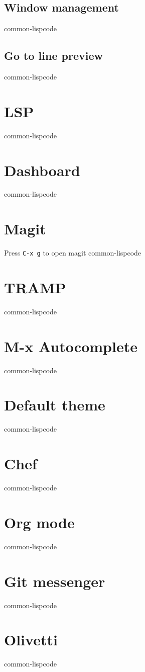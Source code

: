 \documentclass[11pt]{article}
\begin{document}
\subsection{Window management}
\label{sec:org668d97d}
common-lispcode
\subsection{Go to line preview}
\label{sec:org1b7ffdf}
common-lispcode
\section{LSP}
\label{sec:org6a0715c}
common-lispcode
\section{Dashboard}
\label{sec:orgf586485}
common-lispcode
\section{Magit}
\label{sec:orgd3b08e1}

Press \texttt{C-x g} to open magit
common-lispcode
\section{TRAMP}
\label{sec:org5c7230c}
common-lispcode
\section{M-x Autocomplete}
\label{sec:org1879e38}
common-lispcode
\section{Default theme}
\label{sec:org16cf618}
common-lispcode
\section{Chef}
\label{sec:org987c21e}
common-lispcode
\section{Org mode}
\label{sec:org528aca2}
common-lispcode
\section{Git messenger}
\label{sec:orgee993e8}
common-lispcode
\section{Olivetti}
\label{sec:orgb8c7c90}
common-lispcode
\end{document}
